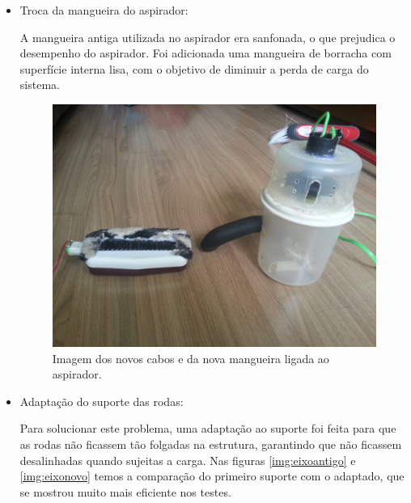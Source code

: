 \begin{itemize}
      \item Troca da mangueira do aspirador:

         A mangueira antiga utilizada no aspirador era sanfonada, o que prejudica o desempenho do aspirador. Foi adicionada uma mangueira de borracha com superfície interna lisa, com o objetivo de diminuir a perda de carga do sistema.

         \begin{figure}[H]
            \centering
            \includegraphics[scale=0.1]{figuras/SuccaoPC3_4.jpg}
            \caption{Imagem dos novos cabos e da nova mangueira ligada ao aspirador.}
            \label{img:novo_sistema_sucção}
         \end{figure}

      \item Adaptação do suporte das rodas:

      	Para solucionar este problema, uma adaptação ao suporte foi feita para que as rodas não ficassem tão folgadas na estrutura, garantindo que não ficassem desalinhadas quando sujeitas a carga. Nas figuras \ref{img:eixoantigo} e \ref{img:eixonovo} temos a comparação do primeiro suporte com o adaptado, que se mostrou muito mais eficiente nos testes.


\end{itemize}
